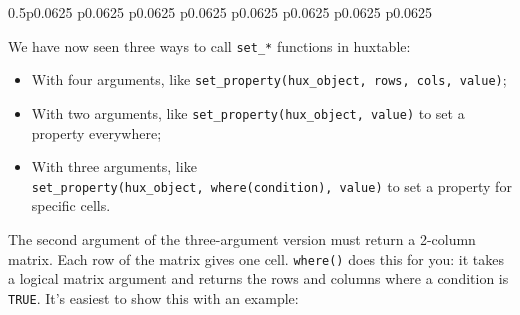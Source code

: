 \documentclass[]{article}
\providecommand{\tightlist}{%
  \setlength{\itemsep}{0pt}\setlength{\parskip}{0pt}}
\begin{document}
\begin{table}[h]
\begin{raggedright}
\begin{tabularx}{0.5\textwidth}{p{} p{} p{} p{} p{} p{} p{} p{}}
\tabularnewline[-0.5pt]


\end{tabularx}
\par\end{raggedright}
\end{table}
\FloatBarrier

We have now seen three ways to call \texttt{set\_*} functions in
huxtable:

\begin{itemize}
\tightlist
\item
  With four arguments, like
  \texttt{set\_property(hux\_object,\ rows,\ cols,\ value)};
\item
  With two arguments, like \texttt{set\_property(hux\_object,\ value)}
  to set a property everywhere;
\item
  With three arguments, like
  \texttt{set\_property(hux\_object,\ where(condition),\ value)} to set
  a property for specific cells.
\end{itemize}

The second argument of the three-argument version must return a 2-column
matrix. Each row of the matrix gives one cell. \texttt{where()} does
this for you: it takes a logical matrix argument and returns the rows
and columns where a condition is \texttt{TRUE}. It's easiest to show
this with an example:
\end{document}
